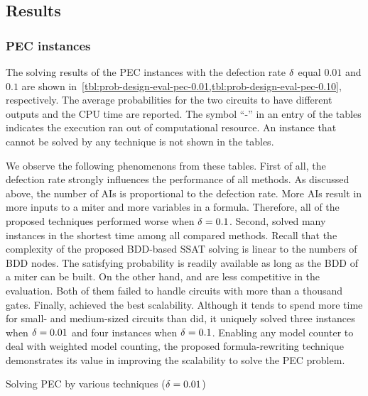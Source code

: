 \subsection{Results}

\subsubsection{PEC instances}
The solving results of the PEC instances with the defection rate $\delta$ equal $0.01$ and $0.1$
are shown in~\cref{tbl:prob-design-eval-pec-0.01,tbl:prob-design-eval-pec-0.10}, respectively.
The average probabilities for the two circuits to have different outputs and the CPU time are reported.
The symbol ``-'' in an entry of the tables indicates the execution ran out of computational resource.
An instance that cannot be solved by any technique is not shown in the tables.

We observe the following phenomenons from these tables.
First of all, the defection rate strongly influences the performance of all methods.
As discussed above, the number of AIs is proportional to the defection rate.
More AIs result in more inputs to a miter and more variables in a formula.
Therefore, all of the proposed techniques performed worse when $\delta=0.1$.
Second, \bddsp solved many instances in the shortest time among all compared methods.
Recall that the complexity of the proposed BDD-based SSAT solving is linear to the numbers of BDD nodes.
The satisfying probability is readily available as long as the BDD of a miter can be built.
On the other hand, \dcssat and \cachet are less competitive in the evaluation.
Both of them failed to handle circuits with more than a thousand gates.
Finally, \approxmc achieved the best scalability.
Although it tends to spend more time for small- and medium-sized circuits than \bddsp did,
it uniquely solved three instances when $\delta=0.01$ and four instances when $\delta=0.1$.
Enabling any model counter to deal with weighted model counting,
the proposed formula-rewriting technique demonstrates its value
in improving the scalability to solve the PEC problem.

\begin{table}[hp]
    \centering
    \scriptsize
    \caption{Solving PEC by various techniques ($\delta=0.01$)}
    \label{tbl:prob-design-eval-pec-0.01}
\end{table}

